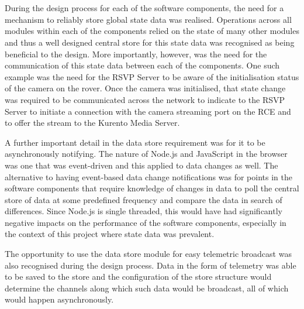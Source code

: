       \\\\
        During the design process for each of the software components, the need for a mechanism to reliably store global state data was realised. Operations across all modules within each of the components relied on the state of many other modules and thus a well designed central store for this state data was recognised as being beneficial to the design. More importantly, however, was the need for the communication of this state data between each of the components. One such example was the need for the RSVP Server to be aware of the initialisation status of the camera on the rover. Once the camera was initialised, that state change was required to be communicated across the network to indicate to the RSVP Server to initiate a connection with the camera streaming port on the RCE and to offer the stream to the Kurento Media Server.
        
        A further important detail in the data store requirement was for it to be asynchronously notifying. The nature of Node.js and JavaScript in the browser was one that was event-driven and this applied to data changes as well. The alternative to having event-based data change notifications was for points in the software components that require knowledge of changes in data to poll the central store of data at some predefined frequency and compare the data in search of differences. Since Node.js is single threaded, this would have had significantly negative impacts on the performance of the software components, especially in the context of this project where state data was prevalent.
        
        The opportunity to use the data store module for easy telemetric broadcast was also recognised during the design process. Data in the form of telemetry was able to be saved to the store and the configuration of the store structure would determine the channels along which such data would be broadcast, all of which would happen asynchronously.
        
